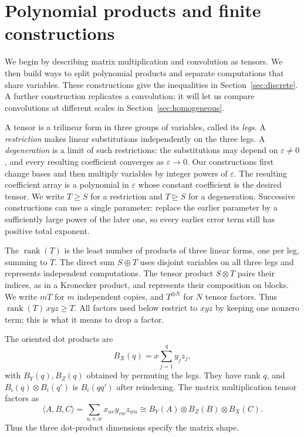 \documentclass[11pt]{article}
\newcommand{\rank}{\operatorname{rank}}
\newcommand{\degen}{\unrhd}
\newcommand{\cmm}[3]{\langle #1,#2,#3\rangle}
\begin{document}
\section{Polynomial products and finite constructions}\label{sec:constructions}

We begin by describing matrix multiplication and convolution as tensors.
We then build ways to split polynomial products and separate computations
that share variables. These constructions give the inequalities in
Section~\ref{sec:discrete}. A further construction replicates a convolution;
it will let us compare convolutions at different scales in
Section~\ref{sec:homogeneous}.

A tensor is a trilinear form in three groups of variables, called its
\emph{legs}. A \emph{restriction} makes linear substitutions independently
on the three legs. A \emph{degeneration} is a limit of such restrictions:
the substitutions may depend on $\varepsilon\ne0$, and every resulting
coefficient converges as $\varepsilon\to0$. Our constructions first change
bases and then multiply variables by integer powers of $\varepsilon$.
The resulting coefficient array is a polynomial in $\varepsilon$ whose
constant coefficient is the desired tensor.
We write $T\ge S$ for a restriction and $T\degen S$ for a degeneration.
Successive constructions can use a single parameter: replace the earlier
parameter by a sufficiently large power of the later one, so every
earlier error term still has positive total exponent.

The $\rank(T)$ is the least number of products of three linear
forms, one per leg, summing to $T$. The direct sum $S\oplus T$ uses
disjoint variables on all three legs and represents independent computations.
The tensor product $S\otimes T$ pairs their indices, as in a Kronecker
product, and represents their composition on blocks. We write $mT$ for
$m$ independent copies, and $T^{\otimes N}$ for $N$ tensor factors.
Thus $\rank(T)\,xyz\ge T$. All factors used below restrict to $xyz$
by keeping one nonzero term; this is what it means to drop a factor.

The oriented dot products are
\[
 B_X(q)=x\sum_{j=1}^q y_jz_j,
\]
with $B_Y(q),B_Z(q)$ obtained by permuting the legs. They have rank $q$,
and $B_i(q)\otimes B_i(q')$ is $B_i(qq')$ after reindexing. The matrix
multiplication tensor factors as
\begin{equation}\label{eq:mm-factorization}
 \cmm{A}{B}{C}
 =\sum_{u,v,w}x_{uv}y_{vw}z_{wu}
 \cong B_Y(A)\otimes B_Z(B)\otimes B_X(C).
\end{equation}
Thus the three dot-product dimensions specify the matrix shape.
\end{document}
